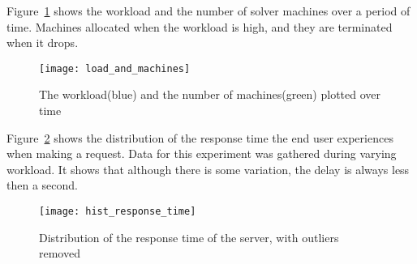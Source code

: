 Figure~\ref{fig:asdf} shows the workload and the number of solver machines over a period of time. Machines allocated when the workload is high, and they are terminated when it drops. 

\begin{figure}[H]
	\texttt{[image: load\_and\_machines]}
	\caption{The workload(blue) and the number of machines(green) plotted over time}
	\label{fig:asdf}
\end{figure}


Figure~\ref{fig:exp:response} shows the distribution of the response time the end user experiences when making a request. Data for this experiment was gathered during varying workload. It shows that although there is some variation, the delay is always less then a second.

\begin{figure}[H]
	\texttt{[image: hist\_response\_time]}
	\caption{Distribution of the response time of the server, with outliers removed}
	\label{fig:exp:response}
\end{figure}
